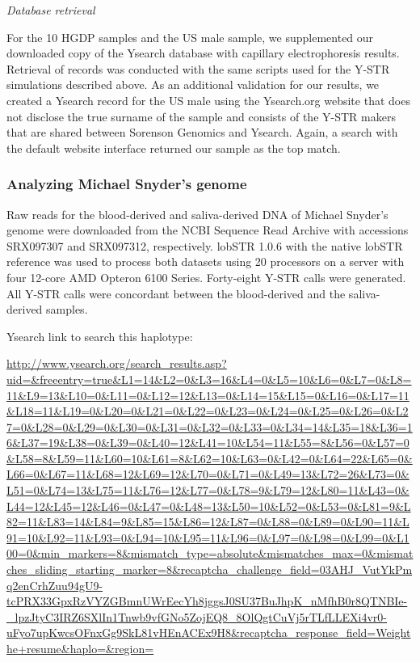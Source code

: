 \emph{Database retrieval}

For the 10 HGDP samples and the US male sample, we supplemented our downloaded copy of the Ysearch database with capillary electrophoresis results. Retrieval of records was conducted with the same scripts used for the Y-STR simulations described above. As an additional validation for our results, we created a Ysearch record for the US male using the Ysearch.org website that does not disclose the true surname of the sample and consists of the Y-STR makers that are shared between Sorenson Genomics and Ysearch. Again, a search with the default website interface returned our sample as the top match.

\subsubsection{Analyzing Michael Snyder's genome}
Raw reads for the blood-derived and saliva-derived DNA of Michael Snyder's genome were downloaded from the NCBI Sequence Read Archive with accessions SRX097307 and SRX097312, respectively. lobSTR 1.0.6 with the native lobSTR reference was used to process both datasets using 20 processors on a server with four 12-core AMD Opteron 6100 Series. Forty-eight Y-STR calls were generated. All Y-STR calls were concordant between the blood-derived and the saliva-derived samples. 

Ysearch link to search this haplotype:

\url{http://www.ysearch.org/search_results.asp?uid=&freeentry=true&L1=14&L2=0&L3=16&L4=0&L5=10&L6=0&L7=0&L8=11&L9=13&L10=0&L11=0&L12=12&L13=0&L14=15&L15=0&L16=0&L17=11&L18=11&L19=0&L20=0&L21=0&L22=0&L23=0&L24=0&L25=0&L26=0&L27=0&L28=0&L29=0&L30=0&L31=0&L32=0&L33=0&L34=14&L35=18&L36=16&L37=19&L38=0&L39=0&L40=12&L41=10&L54=11&L55=8&L56=0&L57=0&L58=8&L59=11&L60=10&L61=8&L62=10&L63=0&L42=0&L64=22&L65=0&L66=0&L67=11&L68=12&L69=12&L70=0&L71=0&L49=13&L72=26&L73=0&L51=0&L74=13&L75=11&L76=12&L77=0&L78=9&L79=12&L80=11&L43=0&L44=12&L45=12&L46=0&L47=0&L48=13&L50=10&L52=0&L53=0&L81=9&L82=11&L83=14&L84=9&L85=15&L86=12&L87=0&L88=0&L89=0&L90=11&L91=10&L92=11&L93=0&L94=10&L95=11&L96=0&L97=0&L98=0&L99=0&L100=0&min_markers=8&mismatch_type=absolute&mismatches_max=0&mismatches_sliding_starting_marker=8&recaptcha_challenge_field=03AHJ_VutYkPmq2enCrhZuu94gU9-tcPRX33GpxRzVYZGBmnUWrEecYh8jggsJ0SU37BuJhpK_nMfhB0r8QTNBIe-_lpzJtyC3IRZ6SXlIn1Tnwb9vfGNo5ZojEQ8_8OlQgtCuVj5rTLfLLEXi4vr0-uFyo7upKwcsOFnxGg9SkL81vHEnACEx9H8&recaptcha_response_field=Weighthe+resume&haplo=&region=}

